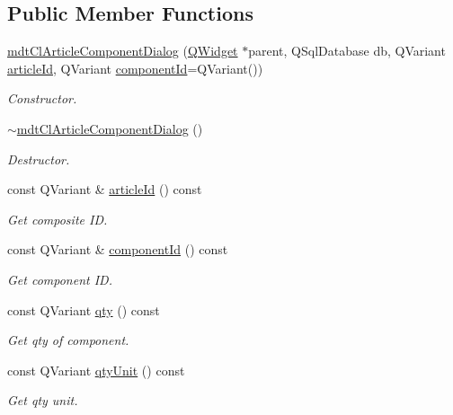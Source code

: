 \subsection*{Public Member Functions}
\begin{DoxyCompactItemize}
\item 
\hyperlink{classmdt_cl_article_component_dialog_a293d48a40384b4e6b545907473ad54a4}{mdt\-Cl\-Article\-Component\-Dialog} (\hyperlink{class_q_widget}{Q\-Widget} $\ast$parent, Q\-Sql\-Database db, Q\-Variant \hyperlink{classmdt_cl_article_component_dialog_a71ba3f37673877ef16680d8d6568799c}{article\-Id}, Q\-Variant \hyperlink{classmdt_cl_article_component_dialog_ab95b190a2bcd240266134942b74d8c45}{component\-Id}=Q\-Variant())
\begin{DoxyCompactList}\small\item\em Constructor. \end{DoxyCompactList}\item 
\hyperlink{classmdt_cl_article_component_dialog_a5ec276610871f18bc0ed2fab6f219c04}{$\sim$mdt\-Cl\-Article\-Component\-Dialog} ()
\begin{DoxyCompactList}\small\item\em Destructor. \end{DoxyCompactList}\item 
const Q\-Variant \& \hyperlink{classmdt_cl_article_component_dialog_a71ba3f37673877ef16680d8d6568799c}{article\-Id} () const 
\begin{DoxyCompactList}\small\item\em Get composite I\-D. \end{DoxyCompactList}\item 
const Q\-Variant \& \hyperlink{classmdt_cl_article_component_dialog_ab95b190a2bcd240266134942b74d8c45}{component\-Id} () const 
\begin{DoxyCompactList}\small\item\em Get component I\-D. \end{DoxyCompactList}\item 
const Q\-Variant \hyperlink{classmdt_cl_article_component_dialog_a66881d6c4d4d8791bd5e29b127c913db}{qty} () const 
\begin{DoxyCompactList}\small\item\em Get qty of component. \end{DoxyCompactList}\item 
const Q\-Variant \hyperlink{classmdt_cl_article_component_dialog_a799575d51b0a2e80985bab8e25d9c5da}{qty\-Unit} () const 
\begin{DoxyCompactList}\small\item\em Get qty unit. \end{DoxyCompactList}\end{DoxyCompactItemize}
